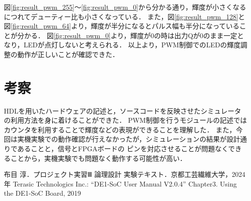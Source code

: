 \documentclass{jlreq}
\numberwithin{equation}{section}
\begin{document}
図\ref{fig:result_pwm_255}～\ref{fig:result_pwm_0}から分かる通り，輝度が小さくなるにつれてデューティー比も小さくなっている．
また，図\ref{fig:result_pwm_128}と図\ref{fig:result_pwm_64}より，輝度が半分になるとパルス幅も半分になっていることが分かる．
図\ref{fig:result_pwm_0}より，輝度が0の時は出力Qが0のまま一定となり，LEDが点灯しないと考えられる．
以上より，PWM制御でのLEDの輝度調整の動作が正しいことが確認できた．

\section{考察}
HDLを用いたハードウェアの記述と，ソースコードを反映させたシミュレータの利用方法を身に着けることができた．
PWM制御を行うモジュールの記述ではカウンタを利用することで輝度などの表現ができることを理解した．
また，今回は実機実験での動作確認が行えなかったが，シミュレーションの結果が設計通りであることと，信号とFPGAボードの
ピンを対応させることが問題なくできることから，実機実験でも問題なく動作する可能性が高い．

\begin{thebibliography}{9}
	 布目 淳．プロジェクト実習Ⅲ 論理設計 実験テキスト．京都工芸繊維大学，2024年
	 Terasic Technologics Inc.:  ``DE1-SoC User Manual V2.0.4'' Chapter3. Using the DE1-SoC Board, 2019
\end{thebibliography}
\end{document}
